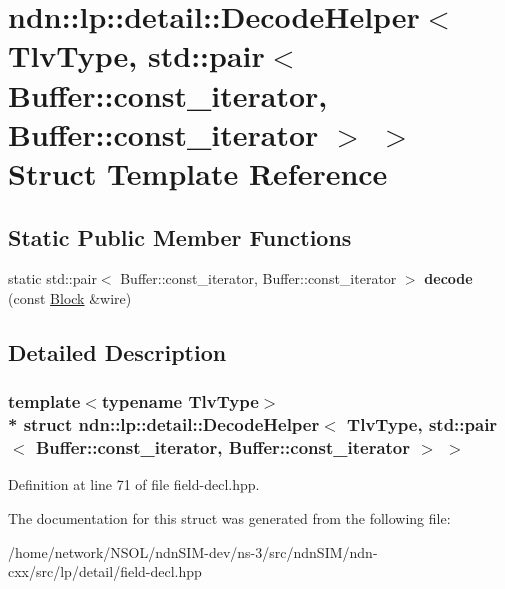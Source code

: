 \hypertarget{structndn_1_1lp_1_1detail_1_1DecodeHelper_3_01TlvType_00_01std_1_1pair_3_01Buffer_1_1const__itere3fbc84f2dd08820754525da787eb6ee}{}\section{ndn\+:\+:lp\+:\+:detail\+:\+:Decode\+Helper$<$ Tlv\+Type, std\+:\+:pair$<$ Buffer\+:\+:const\+\_\+iterator, Buffer\+:\+:const\+\_\+iterator $>$ $>$ Struct Template Reference}
\label{structndn_1_1lp_1_1detail_1_1DecodeHelper_3_01TlvType_00_01std_1_1pair_3_01Buffer_1_1const__itere3fbc84f2dd08820754525da787eb6ee}
\subsection*{Static Public Member Functions}
\begin{DoxyCompactItemize}
\item 
static std\+::pair$<$ Buffer\+::const\+\_\+iterator, Buffer\+::const\+\_\+iterator $>$ {\bfseries decode} (const \hyperlink{classndn_1_1Block}{Block} \&wire)\hypertarget{structndn_1_1lp_1_1detail_1_1DecodeHelper_3_01TlvType_00_01std_1_1pair_3_01Buffer_1_1const__itere3fbc84f2dd08820754525da787eb6ee_ab23b96c91140dfe78fedd4940ee67617}{}\label{structndn_1_1lp_1_1detail_1_1DecodeHelper_3_01TlvType_00_01std_1_1pair_3_01Buffer_1_1const__itere3fbc84f2dd08820754525da787eb6ee_ab23b96c91140dfe78fedd4940ee67617}

\end{DoxyCompactItemize}


\subsection{Detailed Description}
\subsubsection*{template$<$typename Tlv\+Type$>$\\*
struct ndn\+::lp\+::detail\+::\+Decode\+Helper$<$ Tlv\+Type, std\+::pair$<$ Buffer\+::const\+\_\+iterator, Buffer\+::const\+\_\+iterator $>$ $>$}



Definition at line 71 of file field-\/decl.\+hpp.



The documentation for this struct was generated from the following file\+:\begin{DoxyCompactItemize}
\item 
/home/network/\+N\+S\+O\+L/ndn\+S\+I\+M-\/dev/ns-\/3/src/ndn\+S\+I\+M/ndn-\/cxx/src/lp/detail/field-\/decl.\+hpp\end{DoxyCompactItemize}
